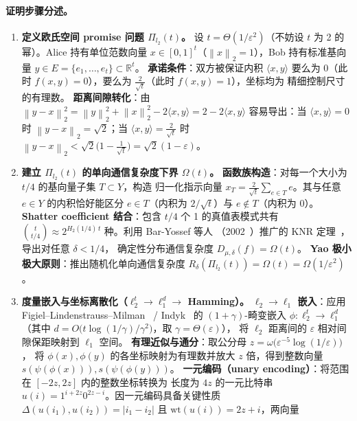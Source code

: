 \documentclass[UTF8, 11pt, a4paper, linestretch=1.15]{ctexart}
\theoremstyle{zhstyle}
\newcommand{\eps}{\varepsilon}
\newcommand{\R}{\mathbb{R}}
\newcommand{\inner}[2]{\langle #1, #2 \rangle}
\newcommand{\norm}[1]{\left\lVert #1 \right\rVert}
\begin{document}
	\paragraph{证明步骤分述。}
	\begin{enumerate}
		\item \textbf{定义欧氏空间 promise 问题 $\Pi_{l_2}(t)$。}
		设 $t = \Theta(1/\eps^2)$（不妨设 $t$ 为 2 的幂）。Alice 持有单位范数向量
		$x \in [0, 1]^t$（$\norm{x}_2 = 1$），Bob 持有标准基向量
		$y \in E = \{e_1, \dots, e_t\} \subset \R^t$。
		\textbf{承诺条件}：双方被保证内积 $\inner{x}{y}$ 要么为 $0$（此时
		$f(x, y) = 0$），要么为 $\frac{2}{\sqrt{t}}$（此时 $f(x, y) = 1$），坐标均为
		精细控制尺寸的有理数。
		\textbf{距离间隙转化}：由
		$\norm{y - x}_2^2 = \norm{y}_2^2 + \norm{x}_2^2 - 2\inner{x}{y}
		= 2 - 2\inner{x}{y}$
		容易导出：当 $\inner{x}{y} = 0$ 时 $\norm{y - x}_2 = \sqrt{2}$；当
		$\inner{x}{y} = \frac{2}{\sqrt{t}}$ 时
		$\norm{y - x}_2 < \sqrt{2}\big(1 - \tfrac{1}{\sqrt{t}}\big)
		= \sqrt{2}(1 - \eps)$。
		\item \textbf{建立 $\Pi_{l_2}(t)$ 的单向通信复杂度下界 $\Omega(t)$。}
		\textbf{函数族构造}：对每一个大小为 $t/4$ 的基向量子集 $T \subset Y$，构造
		归一化指示向量 $x_T = \frac{2}{\sqrt{t}}\sum_{e \in T} e$。其与任意 $e \in Y$
		的内积恰好能区分 $e \in T$（内积为 $2/\sqrt{t}$）与 $e \notin T$（内积为 $0$）。
		\textbf{Shatter coefficient 结合}：包含 $t/4$ 个 1 的真值表模式共有
		$\binom{t}{t/4} \approx 2^{H_2(1/4)\,t}$ 种。利用 Bar-Yossef 等人
		（2002~\cite{BYJKS02}）推广的 KNR 定理~\cite{KNR99}，导出对任意 $\delta < 1/4$，
		确定性分布通信复杂度 $D_{\mu, \delta}(f) = \Omega(t)$。
		\textbf{Yao 极小极大原则}：推出随机化单向通信复杂度
		$R_\delta(\Pi_{l_2}(t)) = \Omega(t) = \Omega(1/\eps^2)$。
		\item \textbf{度量嵌入与坐标离散化（$\ell_2^t \to \ell_1^d \to$ Hamming）。}
		\textbf{$\ell_2 \to \ell_1$ 嵌入}：应用 Figiel--Lindenstrauss--Milman~\cite{FLM77}
		/ Indyk~\cite{Indyk00} 的 $(1+\gamma)$-畸变嵌入
		$\phi: \ell_2^t \to \ell_1^d$（其中
		$d = O\big(t \log(1/\gamma) / \gamma^2\big)$，取 $\gamma = \Theta(\eps)$），
		将 $\ell_2$ 距离间的 $\eps$ 相对间隙保距映射到 $\ell_1$ 空间。
		\textbf{有理近似与通分}：取公分母 $z = \omega\big(\eps^{-5} \log(1/\eps)\big)$，
		将 $\phi(x), \phi(y)$ 的各坐标映射为有理数并放大 $z$ 倍，得到整数向量
		$s(\psi(\phi(x))), s(\psi(\phi(y)))$。
		\textbf{一元编码（unary encoding）}：将范围在 $[-2z, 2z]$ 内的整数坐标转换为
		长度为 $4z$ 的一元比特串 $u(i) = 1^{i+2z} 0^{2z-i}$。因一元编码具备关键性质
		$\Delta(u(i_1), u(i_2)) = |i_1 - i_2|$ 且 $\mathrm{wt}(u(i)) = 2z + i$，两向量

\end{enumerate}
\end{document}

